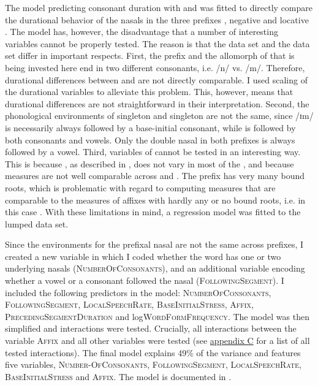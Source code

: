 The model predicting consonant duration with  and  was fitted to directly compare the durational behavior of the nasals in the three prefixes , negative  and locative . The model has, however, the disadvantage that a number of interesting variables cannot be properly tested. The reason is that the  data set and the data set differ in important respects.
First, the prefix  and the allomorph of  that is being invested here end in two different consonants, i.e.  /n/ vs. /m/. Therefore, durational differences between  and  are not directly comparable. I  used scaling of the durational variables to alleviate this problem. This, however, means that durational differences are not straightforward in their interpretation. 
Second, the phonological environments of singleton  and singleton  are not the same, since /ɪm/ is necessarily always followed by a base-initial consonant, while  is followed by both consonants and vowels. Only the double nasal in both prefixes is always followed by a vowel.
Third, variables of   cannot be tested in an interesting way. This is because , as described in , does not vary in most of the , and because  measures are not well comparable across  and . The prefix  has very many bound roots, which is problematic with regard to computing  measures that are comparable to the  measures of affixes with hardly any or no bound roots, i.e. in this case . 
With these limitations in mind, a regression model was fitted to the lumped data set.  

Since the environments for the prefixal nasal are not the same across prefixes, I created a new variable in which I coded whether the word has one or two underlying nasals (\textsc{NumberOfConsonants}), and an additional variable encoding whether a vowel or a consonant followed the nasal (\textsc{FollowingSegment}). I included the following predictors in the model: \textsc{NumberOfConsonants}, \textsc{FollowingSegment}, \textsc{LocalSpeechRate},  \textsc{BaseInitialStress}, \textsc{Affix}, \textsc{PrecedingSegmentDuration} and log\textsc{WordFormFrequency}.
The model was then simplified and interactions were tested. Crucially, all interactions between the variable \textsc{Affix} and all other variables were tested (see \hyperref[Appendix C: Summaries of tested interactions in corpus study]{appendix C} for a list of all tested interactions). 
The final model explains 49\% of the variance and features five variables, \textsc{Number-OfConsonants}, \textsc{FollowingSegment}, \textsc{LocalSpeechRate}, \textsc{BaseInitialStress} and \textsc{Affix}. The model is documented in .




